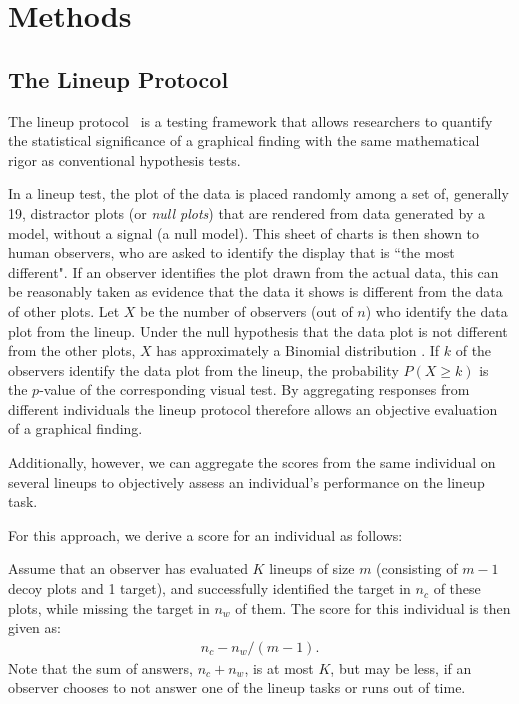 \documentclass[11pt]{isuthesis}\usepackage[]{graphicx}\usepackage[]{color}
\begin{document}
\section{Methods}\label{sec:methods}

\subsection{The Lineup Protocol}
The lineup protocol~\citep{hofmann2012graphical,wickham2010graphical, buja2009statistical} is a testing framework that allows researchers to quantify the statistical significance of a graphical finding with the same mathematical rigor as conventional hypothesis tests.

In a lineup test, the plot of the data is placed randomly among a set of, generally 19, distractor plots (or {\it null plots}) that are rendered from data generated by a model, without a signal (a null model). This sheet of charts is then shown to human observers, who are asked to identify the display that is ``the most different". If an observer identifies the plot drawn from the actual data, this can be reasonably taken as evidence that the data it shows is different from the data of other plots.
Let $X$ be the number of observers (out of $n$) who identify the data plot from the lineup. Under the null hypothesis that the data plot is not different from the other plots, $X$ has approximately a Binomial distribution \citep{wickham2010graphical, majumder2013validation}. If $k$ of the observers identify the data plot from the lineup, the probability $P(X \ge k)$ is the $p$-value of the corresponding visual test. 
%
By aggregating responses from different individuals the lineup protocol therefore allows an objective evaluation of a graphical finding. 

Additionally, however, we can aggregate the scores from the same individual on several lineups to objectively assess an individual's performance on the lineup task. 

For this approach, we derive a score for an individual as follows:

Assume that an observer has evaluated $K$ lineups of size $m$ (consisting of $m-1$ decoy plots and 1 target), and successfully identified the target in $n_c$ of these plots, while missing the target in $n_w$ of them. 
The score for this individual is then given as:
\begin{eqnarray}\label{eq.scoring1}
n_c - n_w/(m-1).
\end{eqnarray}
Note that the sum of answers, $n_c + n_w$, is at most $K$, but may be less, if an observer chooses to not answer one of the lineup tasks or runs out of time.
\end{document}
